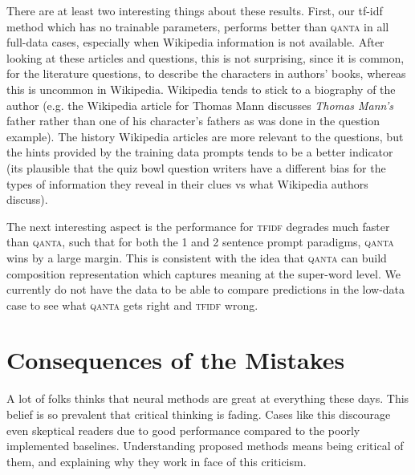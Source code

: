 \documentclass[12pt]{article}
\begin{document}
There are at least two interesting things about these results.
First, our tf-idf method which has no trainable parameters,
performs better than \textsc{qanta} in all full-data cases,
especially when Wikipedia information is not available.
After looking at these articles and questions, this is not surprising,
since it is common, for the literature questions, to describe the characters in authors'
books, whereas this is uncommon in Wikipedia. Wikipedia tends to stick to a biography of
the author (e.g. the Wikipedia article for Thomas Mann discusses {\em Thomas Mann's} father
rather than one of his character's fathers as was done in the question example).
The history Wikipedia articles are more relevant to the questions, but the hints provided
by the training data prompts tends to be a better indicator
(its plausible that the quiz bowl question writers have a different bias
for the types of information they reveal in their clues vs what Wikipedia authors discuss).


The next interesting aspect is the performance for \textsc{tfidf}
degrades much faster than \textsc{qanta}, such that for both the
1 and 2 sentence prompt paradigms, \textsc{qanta} wins by a large margin.
This is consistent with the idea that \textsc{qanta} can build composition
representation which captures meaning at the super-word level.
We currently do not have the data to be able to compare predictions in the
low-data case to see what \textsc{qanta} gets right and \textsc{tfidf} wrong.





\section{Consequences of the Mistakes}
A lot of folks thinks that neural methods are great at everything these days.
This belief is so prevalent that critical thinking is fading.
Cases like this discourage even skeptical readers due to good performance
compared to the poorly implemented baselines.
Understanding proposed methods means being critical of them,
and explaining why they work in face of this criticism.




\end{document}

